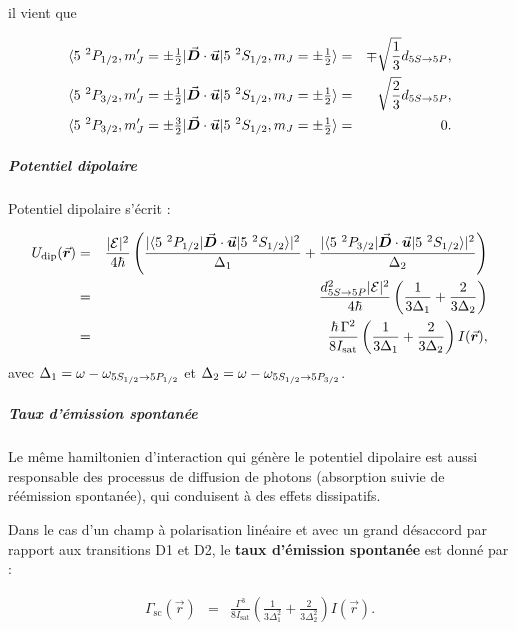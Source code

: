 il vient que 

\begin{eqnarray*}
	\langle 5 {~}^2P_{1/2} , m_J' = \pm\tfrac12 \vert \vec{{\bm{D}}} \cdot \vec{{\bm{u}}}\vert 5 {~}^2S_{1/2} , m_J = \pm  \tfrac12 \rangle	 &=& \mp  \sqrt{\frac{1}{3}} d_{\scriptstyle 5S \rightarrow 5P},\\
	\langle 5 {~}^2P_{3/2} , m_J' = \pm \tfrac12 \vert \vec{{\bm{D}}} \cdot \vec{{\bm{u}}}\vert 5 {~}^2S_{1/2} , m_J = \pm  \tfrac12 \rangle	 &=& \sqrt{\frac{2}{3}} d_{\scriptstyle 5S \rightarrow 5P} , \\
	\langle 5 {~}^2P_{3/2} , m_J' = \pm \tfrac32 \vert \vec{{\bm{D}}} \cdot \vec{{\bm{u}}}\vert 5 {~}^2S_{1/2} , m_J = \pm  \tfrac12 \rangle & = & 0 .
\end{eqnarray*}


\subparagraph{Potentiel dipolaire}

Potentiel dipolaire s'écrit :

\begin{eqnarray*}
	U_{\mathrm{dip}}(\operatorvec{r}) &  = & \frac{ \vert \mathcal{E} \vert^2}{4 \hbar} \left( \frac{ \vert \langle 5 {~}^2P_{1/2}  \vert \operatorvec{D} \cdot \operatorvec{u}\vert 5 {~}^2S_{1/2}  \rangle \vert^2}{ \Delta_1} + \frac{ \vert\langle 5 {~}^2P_{3/2}  \vert \operatorvec{D} \cdot \operatorvec{u}\vert 5 {~}^2S_{1/2}  \rangle \vert^2}{ \Delta_2}  \right )\\ & = &  \frac{  d_{\scriptstyle 5S \rightarrow 5P}^2 \vert \mathcal{E} \vert^2 }{4 \hbar} \left( \frac{ 1}{ 3 \Delta_1} + \frac{2 }{ 3 \Delta_2}  \right ) \\&=& \frac{\hbar \, \Gamma^2}{8 I_{\mathrm{sat}}} \left( \frac{ 1}{ 3 \Delta_1} + \frac{2 }{ 3 \Delta_2}  \right ) I(\operatorvec{r}) ,		
\end{eqnarray*}
avec $\Delta_1 = \omega -\omega_{\tiny 5S_{1/2} \rightarrow 5P_{1/2}} $ et $\Delta_2 = \omega -\omega_{\tiny 5S_{1/2} \rightarrow 5P_{3/2}} $.

\subparagraph{Taux d’émission spontanée}
Le même hamiltonien d’interaction qui génère le potentiel dipolaire est aussi responsable des processus de diffusion de photons (absorption suivie de réémission spontanée), qui conduisent à des effets dissipatifs.

Dans le cas d’un champ à polarisation linéaire et avec un grand désaccord par rapport aux transitions D1 et D2, le {\bf taux d’émission spontanée} est donné par :

\begin{eqnarray}
\Gamma_{\mathrm{sc}}(\vec{r}) & = & \frac{\Gamma^3}{8 I_{\mathrm{sat}}} \left( \frac{1}{3 \Delta_1^2} + \frac{2}{3 \Delta_2^2} \right) I(\vec{r}) .
\label{eq:scattering_rate}
\end{eqnarray}

